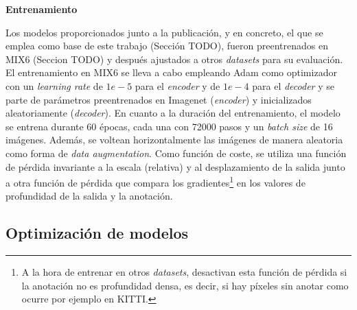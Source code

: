 \textbf{Entrenamiento}

Los modelos proporcionados junto a la publicación, y en concreto, el que se emplea como base de este trabajo (Sección TODO), fueron preentrenados en MIX6 (Seccion TODO) y después ajustados a otros \textit{datasets} para su evaluación. El entrenamiento en MIX6 se lleva a cabo empleando Adam como optimizador con un \textit{learning rate} de $1e-5$ para el \textit{encoder} y de $1e-4$ para el \textit{decoder} y se parte de parámetros preentrenados en Imagenet (\textit{encoder}) y inicializados aleatoriamente (\textit{decoder}). En cuanto a la duración del entrenamiento, el modelo se entrena durante 60 épocas, cada una con 72000 pasos y un \textit{batch size} de 16 imágenes. Además, se voltean horizontalmente las imágenes de manera aleatoria como forma de \textit{data augmentation}. Como función de coste, se utiliza una función de pérdida \cite{midas-intel} invariante a la escala (relativa) y al desplazamiento de la salida junto a otra función de pérdida que compara los gradientes\footnote{A la hora de entrenar en otros \textit{datasets}, desactivan esta función de pérdida si la anotación no es profundidad densa, es decir, si hay píxeles sin anotar como ocurre por ejemplo en KITTI.} \cite{MegaDepthLi18} en los valores de profundidad de la salida y la anotación.

\subsection{Optimización de modelos}


